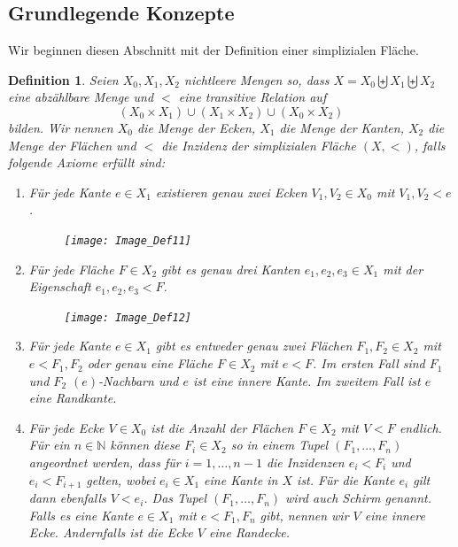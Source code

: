 \documentclass[12pt,titlepage,twoside,cleardoublepage]{article}
\theoremstyle{nummermitklammern}
\newtheorem{definition}[temp]{Definition}
\newtheorem{definition}[zahl]{Definition}
\numberwithin{equation}{section}
\begin{document}
\subsection{Grundlegende Konzepte}
Wir beginnen diesen Abschnitt mit der Definition einer simplizialen Fläche.
\begin{definition}{ \textsc{\cite{Rey}}}  \label{def1} 
Seien $X_0,X_1,X_2$ nichtleere Mengen so, dass $X=X_{0} \biguplus X_{1} \biguplus X_{2}$ eine abzählbare Menge und $<$ eine transitive Relation auf   
\[
(X_{0}\times X_{1}) \cup (X_{1}\times X_{2})\cup (X_{0}\times X_{2})
\]
 bilden.
 Wir nennen $X_{0}$ \emph{die Menge der Ecken}, $X_{1}$ \emph{die Menge der Kanten}, $X_{2}$ \emph{die Menge der Flächen} und $<$ die \emph{Inzidenz} der \emph{simplizialen Fläche} $(X,<)$, falls folgende Axiome erfüllt sind:
 \begin{enumerate}
\item Für jede Kante $e \in X_{1}$ existieren genau zwei Ecken $V_1,V_2 \in X_{0}$ mit $V_1,V_2 < e$. 
\begin{figure}[H]
\begin{center}
\texttt{[image: Image\_Def11]}
\end{center}
\end{figure}
\item Für jede Fläche $F\in X_2$ gibt es genau drei Kanten $e_1,e_2,e_3 \in X_{1}$ mit der Eigenschaft $e_1,e_2,e_3 < F$.
\begin{figure}[H]
\begin{center}
\texttt{[image: Image\_Def12]}
\end{center}
\end{figure} 
\item Für jede Kante $e \in X_{1}$ gibt es entweder genau zwei Flächen $F_{1},F_{2} \in X_{2}$ mit $e <F_{1},F_2$ oder
genau eine Fläche $F \in X_{2}$ mit $e < F$. Im ersten Fall sind $F_{1}$ und $F_{2}$ \emph{$(e)$-Nachbarn} und $e$ ist eine \emph{innere Kante}. Im zweitem Fall ist $e$ eine \emph{Randkante}. 
 \item Für jede Ecke $V \in X_{0}$ ist die Anzahl der Flächen $F\in X_{2}$ mit $V < F$ endlich.
  Für ein $n\in \mathbb{N}$ können diese $F_{i}\in X_2$ so in einem Tupel $(F_{1},\ldots,F_{n})$ angeordnet werden, dass für $i=1,\ldots,n-1$  die Inzidenzen $e_i<F_{i}$ und $e_i<F_{i+1}$ gelten, wobei $e_i\in X_1$ eine Kante  in $X$ ist. Für die Kante $e_i$ gilt dann ebenfalls $V<e_i$. 
  Das Tupel $(F_1,\ldots,F_n)$ wird auch \emph{Schirm} genannt. Falls es eine Kante $e\in X_1$ mit $e<F_{1},F_{n}$ gibt, nennen wir $V$ eine innere Ecke. Andernfalls ist die Ecke $V$ eine \emph{Randecke}.

\end{enumerate}
\end{definition}
\end{document}
